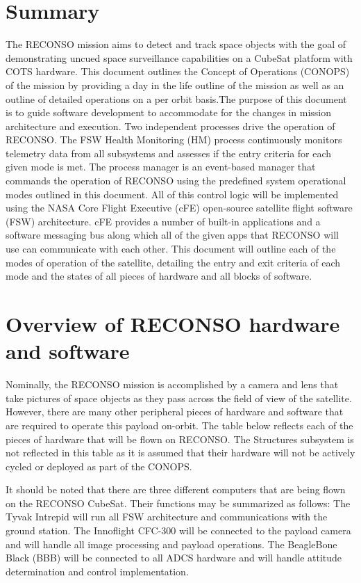 \documentclass{article}
\begin{document}

\newpage
\section*{Summary}

The RECONSO mission aims to detect and track space objects with the goal of demonstrating uncued space surveillance capabilities on a CubeSat platform with COTS hardware. This document outlines the Concept of Operations (CONOPS) of the mission by providing a day in the life outline of the mission as well as an outline of detailed operations on a per orbit basis.The purpose of this document is to guide software development to accommodate for the changes in mission architecture and execution.
Two independent processes drive the operation of RECONSO. The FSW Health Monitoring (HM) process continuously monitors telemetry data from all subsystems and assesses if the entry criteria for each given mode is met. The process manager is an event-based manager that commands the operation of RECONSO using the predefined system operational modes outlined in this document. All of this control logic will be implemented using the NASA Core Flight Executive (cFE) open-source satellite flight software (FSW) architecture. cFE provides a number of built-in applications and a software messaging bus along which all of the given apps that RECONSO will use can communicate with each other. This document will outline each of the modes of operation of the satellite, detailing the entry and exit criteria of each mode and the states of all pieces of hardware and all blocks of software.

\section{Overview of RECONSO hardware and software}

Nominally, the RECONSO mission is accomplished by a camera and lens that take pictures of space objects as they pass across the field of view of the satellite. However, there are many other peripheral pieces of hardware and software that are required to operate this payload on-orbit. The table below reflects each of the pieces of hardware that will be flown on RECONSO. The Structures subsystem is not reflected in this table as it is assumed that their hardware will not be actively cycled or deployed as part of the CONOPS.

It should be noted that there are three different computers that are being flown on the RECONSO CubeSat. Their functions may be summarized as follows: The Tyvak Intrepid will run all FSW architecture and communications with the ground station. The Innoflight CFC-300 will be connected to the payload camera and will handle all image processing and payload operations. The BeagleBone Black (BBB) will be connected to all ADCS hardware and will handle attitude determination and control implementation.
\end{document}
